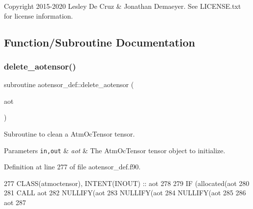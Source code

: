 \begin{DoxyCopyright}{Copyright}
2015-\/2020 Lesley De Cruz \& Jonathan Demaeyer. See L\+I\+C\+E\+N\+S\+E.\+txt for license information. 
\end{DoxyCopyright}


\subsection{Function/\+Subroutine Documentation}
\mbox{\label{namespaceaotensor__def_a255887ee29cab31f0f875181adc8d18a}} 
\subsubsection{\texorpdfstring{delete\+\_\+aotensor()}{delete\_aotensor()}}
{\footnotesize\ttfamily subroutine aotensor\+\_\+def\+::delete\+\_\+aotensor (\begin{DoxyParamCaption}\item[{class(\hyperlink{structaotensor__def_1_1atmoctensor}{atmoctensor}), intent(inout)}]{aot }\end{DoxyParamCaption})\hspace{0.3cm}{\ttfamily [private]}}



Subroutine to clean a Atm\+Oc\+Tensor tensor. 


\begin{DoxyParams}[1]{Parameters}
\mbox{\tt in,out}  & {\em aot} & The Atm\+Oc\+Tensor tensor object to initialize. \\
\hline
\end{DoxyParams}


Definition at line 277 of file aotensor\+\_\+def.\+f90.


\begin{DoxyCode}
277     \textcolor{keywordtype}{CLASS}(atmoctensor), \textcolor{keywordtype}{INTENT(INOUT)} :: aot
278 
279     \textcolor{keywordflow}{IF} (\textcolor{keyword}{allocated}(aot%
280 
281     \textcolor{keyword}{CALL }aot%
282     \textcolor{keyword}{NULLIFY}(aot%
283     \textcolor{keyword}{NULLIFY}(aot%
284     \textcolor{keyword}{NULLIFY}(aot%
285 
286     aot%
287 
\end{DoxyCode}
\mbox{\label{namespaceaotensor__def_af3321529da46b7dbd5792db9c397d4d7}} 
